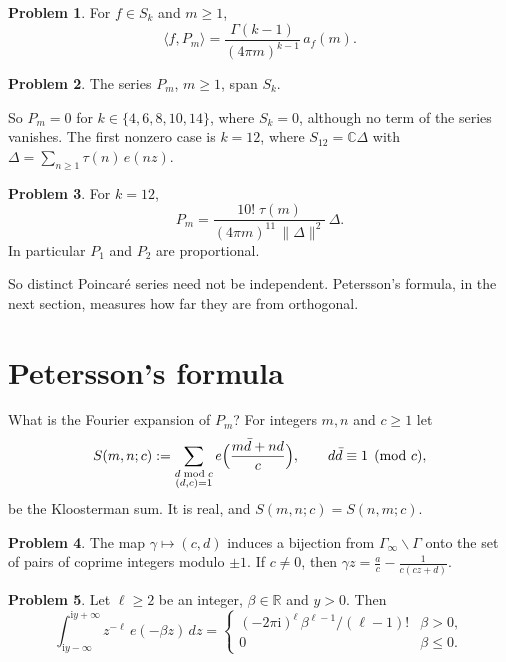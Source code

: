 \documentclass[reqno]{amsart}
\theoremstyle{definition}
\newtheorem{problem}{Problem}[section]
\theoremstyle{plain}
\newcommand{\R}{\mathbb{R}}
\newcommand{\C}{\mathbb{C}}
\newcommand{\ii}{\mathrm{i}}
\begin{document}
\begin{problem}\label{pr:unfold}
For \(f \in S_k\) and \(m \ge 1\),
\[
  \langle f, P_m\rangle = \frac{\Gamma(k-1)}{(4\pi m)^{k-1}}\, a_f(m) .
\]
\end{problem}

\begin{problem}\label{pr:span}
The series \(P_m\), \(m \ge 1\), span \(S_k\).
\end{problem}

So \(P_m = 0\) for \(k \in \{4, 6, 8, 10, 14\}\), where \(S_k = 0\), although no term of the series vanishes.  The first nonzero case is \(k = 12\), where \(S_{12} = \C\Delta\) with \(\Delta = \sum_{n \ge 1}\tau(n)\,e(nz)\).

\begin{problem}\label{pr:k12}
For \(k = 12\),
\[
  P_m = \frac{10!\;\tau(m)}{(4\pi m)^{11}\,\lVert\Delta\rVert^2}\,\Delta .
\]
In particular \(P_1\) and \(P_2\) are proportional.
\end{problem}

So distinct Poincar\'e series need not be independent.  Petersson's formula, in the next section, measures how far they are from orthogonal.

\section{Petersson's formula}\label{sec:petersson}

What is the Fourier expansion of \(P_m\)?  For integers \(m, n\) and \(c \ge 1\) let
\[
  S(m,n;c) := \sum_{\substack{d \bmod c\\ (d,c) = 1}} e\Bigl(\frac{m\bar d + nd}{c}\Bigr), \qquad d\bar d \equiv 1 \pmod c,
\]
be the Kloosterman sum.  It is real, and \(S(m,n;c) = S(n,m;c)\).

\begin{problem}\label{pr:cosets}
The map \(\gamma \mapsto (c,d)\) induces a bijection from \(\Gamma_\infty\backslash\Gamma\) onto the set of pairs of coprime integers modulo \(\pm1\).  If \(c \ne 0\), then \(\gamma z = \frac ac - \frac{1}{c(cz+d)}\).
\end{problem}

\begin{problem}\label{pr:lipschitz}
Let \(\ell \ge 2\) be an integer, \(\beta \in \R\) and \(y > 0\).  Then
\[
  \int_{\ii y - \infty}^{\ii y + \infty} z^{-\ell}\, e(-\beta z)\, dz =
  \begin{cases} (-2\pi\ii)^\ell\, \beta^{\ell-1}/(\ell-1)! & \beta > 0,\\ 0 & \beta \le 0. \end{cases}
\]
\end{problem}
\end{document}

